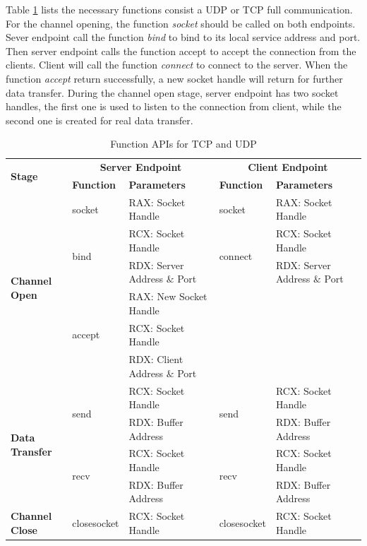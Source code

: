 Table \ref{tcpupdfunctions} lists the necessary functions consist a UDP or TCP full communication. For the channel opening, the function \textit{socket} should be called on both endpoints. Sever endpoint call the function \textit{bind} to bind to its local service address and port. Then server endpoint calls the function accept to accept the connection from the clients. Client will call the function \textit{connect} to connect to the server. When the function \textit{accept} return successfully, a new socket handle will return for further data transfer. During the channel open stage, server endpoint has two socket handles, the first one is used to listen to the connection from client, while the second one is created for real data transfer.
     \begin{table}[H]
        \centering
        \caption{Function APIs for TCP and UDP}
        \label{tcpupdfunctions}
        \begin{tabular}{|l|l|l|l|l|}
            \hline
             \multirow{2}{*}{\textbf{Stage}} &
               \multicolumn{2}{c|}{\textbf{Server Endpoint}} &
               \multicolumn{2}{c|}{\textbf{Client Endpoint}} \\
             \cline{2-5}
              & \textbf{Function}& \textbf{Parameters} & \textbf{Function} & \textbf{Parameters}  \\
             \hline
             \multirow{6}{*}{{\textbf{Channel Open}}}
             &socket&  RAX: Socket Handle & socket &  RAX: Socket Handle\\
              \cline{2-5}
              &\multirow{2}{*}{{bind}} &  RCX: Socket Handle & \multirow{2}{*}{connect} &  RCX: Socket Handle\\
              \cline{3-3} \cline{5-5}
             &&  RDX: Server Address $\&$ Port &  &  RDX: Server Address $\&$ Port\\
              \cline{2-5}
             &\multirow{3}{*}{{accept}} &  RAX: New Socket Handle && \\
              \cline{3-3} 
             &&  RCX:  Socket Handle &  & \\
             \cline{3-3} 
             &&  RDX: Client Address $\&$ Port &  &  \\
            \hline
             \multirow{4}{*}{{\textbf{Data Transfer}}}
             &\multirow{2}{*}{send} &  RCX: Socket Handle & \multirow{2}{*}{send} &  RCX: Socket Handle\\
              \cline{3-3} \cline{5-5}
             &&  RDX: Buffer Address &  &  RDX: Buffer Address\\
            \cline{2-5}
             & \multirow{2}{*}{recv}&  RCX: Socket Handle & \multirow{2}{*}{recv} &  RCX: Socket Handle\\
              \cline{3-3} \cline{5-5}
              &&  RDX: Buffer Address &  &  RDX: Buffer Address\\
            \hline
          {{\textbf{Channel Close}}}&
            {closesocket} & {RCX: Socket Handle} &{closesocket} & {RCX: Socket Handle}\\
            \hline
        \end{tabular}
    \end{table} 
    
